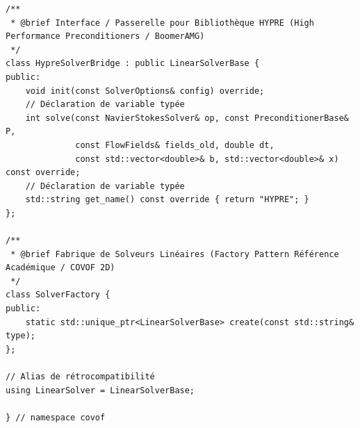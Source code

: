 \documentclass[10pt,a4paper,oneside]{book}
\begin{document}
\begin{lstlisting}[language={[11]C++}]
/**
 * @brief Interface / Passerelle pour Bibliothèque HYPRE (High Performance Preconditioners / BoomerAMG)
 */
class HypreSolverBridge : public LinearSolverBase {
public:
    void init(const SolverOptions& config) override;
    // Déclaration de variable typée
    int solve(const NavierStokesSolver& op, const PreconditionerBase& P,
              const FlowFields& fields_old, double dt,
              const std::vector<double>& b, std::vector<double>& x) const override;
    // Déclaration de variable typée
    std::string get_name() const override { return "HYPRE"; }
};

/**
 * @brief Fabrique de Solveurs Linéaires (Factory Pattern Référence Académique / COVOF 2D)
 */
class SolverFactory {
public:
    static std::unique_ptr<LinearSolverBase> create(const std::string& type);
};

// Alias de rétrocompatibilité
using LinearSolver = LinearSolverBase;

} // namespace covof

\end{lstlisting}
\end{document}
